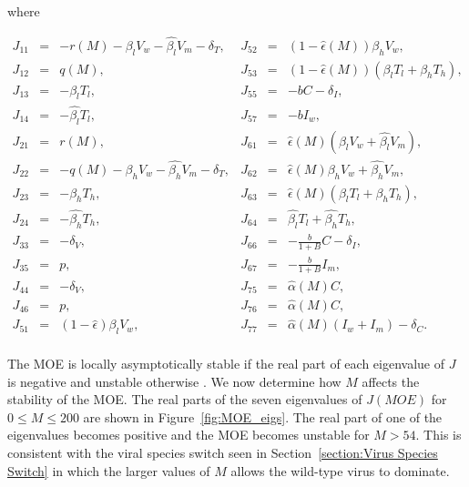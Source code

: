 \documentclass[11pt, oneside]{article}    %
\begin{document}
where 

\begin{center}
$\begin{array}{rclrcl}
J_{11} & =&-r(M) - \beta_l V_w - \hat{\beta_l} V_m -\delta_T,                  &J_{52} & = &(1 - \hat{\epsilon}(M)) \beta_h V_w,  \\
 J_{12} & = & q(M),                            &J_{53} & = & (1 - \hat{\epsilon} (M))(\beta_l T_l + \beta_h T_h), \\
 J_{13} & = & -\beta_l T_l,                            &J_{55} & = &  -bC - \delta_I,  \\
 J_{14} & = &  -\hat{\beta_l} T_l,                         &J_{57} & = &  -b I_w,  \\
J_{21} & = & r(M),                     & J_{61} & = &\hat{\epsilon}(M) ( \beta_l V_w + \hat{\beta_l} V_m), \\
 J_{22} & = & -q(M)-\beta_h V_w - \hat{\beta_h} V_m -\delta_T,      & J_{62} & = &  \hat{\epsilon}(M)  \beta_h V_w + \hat{\beta_h} V_m, \\
J_{23} & = &  -\beta_h T_h,                    & J_{63} & = & \hat{\epsilon}(M) (\beta_l T_l + \beta_h T_h), \\
 J_{24}& = &  -\hat{\beta_h} T_h,                   & J_{64} & = &  \hat{\beta_l} T_l +\hat{\beta_h} T_h,     \\
J_{33} & = &-\delta_V,                   &J_{66} & = & -\frac{b}{1+B} C - \delta_I,  \\
J_{35} & = & p,                  &J_{67} & = &  -\frac{b}{1+B} I_m, \\
 J_{44} & = & -\delta_V,                &J_{75} & = & \hat{\alpha}(M)  C,  \\
 J_{46} &= & p,            &J_{76} & = &  \hat{\alpha}(M) C,   \\
J_{51} & = & (1 - \hat{\epsilon}) \beta_l V_w,               & J_{77} & = &  \hat{\alpha}(M)(I_w + I_m) - \delta_C.   \\
\end{array}$
\end{center}

 The MOE is locally asymptotically stable if the real part of each eigenvalue of $J$ is negative and unstable otherwise \cite{Perko,Jordan}. We now determine how $M$ affects the stability of the MOE.  The real parts of the seven eigenvalues of $J(MOE)$ for $0 \leq M \leq 200$ are shown in Figure~\ref{fig:MOE_eigs}. The real part of one of the eigenvalues becomes positive and the MOE becomes unstable for $M > 54$. This is consistent with the viral species switch seen in Section~\ref{section:Virus Species Switch} in which the larger values of $M$ allows the wild-type virus to dominate.
\end{document}
